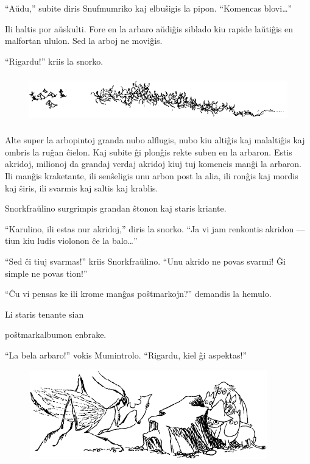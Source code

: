 ``Aŭdu,'' subite diris Snufmumriko kaj elbuŝigis la pipon. ``Komencas blovi{\ldots}''

Ili haltis por aŭskulti. Fore en la arbaro aŭdiĝis siblado kiu rapide laŭtiĝis en malfortan ululon. Sed la arboj ne moviĝis.

``Rigardu!'' kriis la snorko.

\begin{figure}[htbp]
\centering
\includegraphics[width=400pt,height=58pt]{8-4.png}
\caption{}
\label{8-4}
\end{figure}

Alte super la arbopintoj granda nubo alflugis, nubo kiu altiĝis kaj malaltiĝis kaj ombris la ruĝan ĉielon. Kaj subite ĝi plonĝis rekte suben en la arbaron. Estis akridoj, milionoj da grandaj verdaj akridoj kiuj tuj komencis manĝi la arbaron. Ili manĝis kraketante, ili senŝeligis unu arbon post la alia, ili ronĝis kaj mordis kaj ŝiris, ili svarmis kaj saltis kaj krablis.

Snorkfraŭlino surgrimpis grandan ŝtonon kaj staris kriante.

``Karulino, ili estas nur akridoj,'' diris la snorko. ``Ja vi jam renkontis akridon --- tiun kiu ludis violonon ĉe la balo{\ldots}''

``Sed ĉi tiuj svarmas!'' kriis Snorkfraŭlino. ``Unu akrido ne povas svarmi! Ĝi simple ne povas tion!''

``Ĉu vi pensas ke ili krome manĝas poŝtmarkojn?'' demandis la hemulo.

Li staris tenante sian

poŝtmarkalbumon enbrake.

``La bela arbaro!'' vokis Mumintrolo. ``Rigardu, kiel ĝi aspektas!''

\begin{figure}[htbp]
\centering
\includegraphics[width=293pt,height=110pt]{8-5.png}
\caption{}
\label{8-5}
\end{figure}

